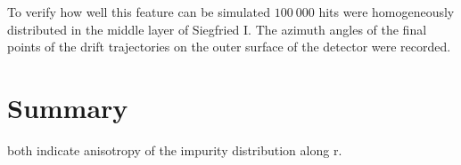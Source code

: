 To verify how well this feature can be simulated $100\ 000$ hits were homogeneously distributed in the middle layer of Siegfried I. The azimuth angles of the final points of the drift trajectories on the outer surface of the detector were recorded.

\section{Summary}
\label{sec:psa:sum}

both indicate anisotropy of the impurity distribution along r.

